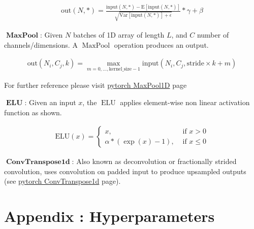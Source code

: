 \begin{equation}
\begin{aligned}
    \text{out}(N, *) = \frac{\text{input}(N, *) - \mathrm{E}[\text{input}(N, *)]}{ \sqrt{\mathrm{Var}[\text{input}(N, *) ] + \epsilon}} * \gamma + \beta
\end{aligned}
\label{eqn:layernorm}
\end{equation}



$\operatorname{\textbf{MaxPool}}$: Given $N$ batches of 1D array of length $L$, and $C$ number of channels/dimensions. A $\operatorname{MaxPool}$ operation produces an output. 

\begin{equation}
\begin{aligned}
    \text{out}(N_i, C_j, k) = \max_{m=0, \ldots, \text{kernel\_size} - 1}
                \text{input}(N_i, C_j, \text{stride} \times k + m)
\end{aligned}
\label{eqn:maxpool}
\end{equation}

For further reference please visit \href{https://pytorch.org/docs/stable/generated/torch.nn.MaxPool1d.html}{pytorch MaxPool1D} page 

$\operatorname{\textbf{ELU}}$: Given an input $x$, the $\operatorname{ELU}$ applies element-wise non linear activation function as shown.

\begin{equation}
\begin{aligned}
    \text{ELU}(x) = \begin{cases}
        x, & \text{ if } x > 0\\
        \alpha * (\exp(x) - 1), & \text{ if } x \leq 0
        \end{cases}
\end{aligned}
\label{eqn:elu}
\end{equation}


$\operatorname{\textbf{ConvTranspose1d}}$: Also known as deconvolution or fractionally strided convolution, uses convolution on padded input to produce upsampled outputs (see \href{https://pytorch.org/docs/stable/generated/torch.nn.ConvTranspose1d.html}{pytorch ConvTranspose1d} page).

\section{Appendix : Hyperparameters}
\label{appendix:hyperparameters}

